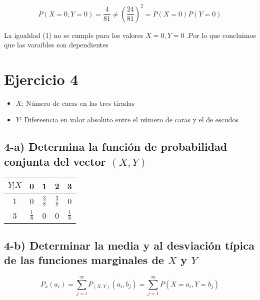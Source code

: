 \documentclass[12pt]{article}
\begin{document}
\begin{equation*}
    P\left(X = 0,Y = 0\right) =   \displaystyle \frac{4}{81}  \neq \displaystyle \left(\frac{24}{81}\right)^2 = P\left(X = 0\right) P\left(Y = 0\right)
\end{equation*}

\begin{flushleft}
    La igualdad (1) no se cumple para los valores  $X = 0,Y = 0$ .Por lo que concluimos que 
    las varaibles son dependientes 
\end{flushleft}


\section*{Ejercicio 4 }

\begin{itemize}
    \item $X$: N\'umero de caras en las tres tiradas
    \item $Y$: Difereencia en valor absoluto entre el n\'umero de caras y el de escudos
\end{itemize}

\subsection*{4-a) Determina la funci\'on de probabilidad conjunta del vector $\left(X,Y\right)$}


\begin{center}
    \renewcommand{\arraystretch}{1.5}
    \begin{tabular}{|c|c|c|c|c|}
        \hline
        $Y|X$ & 0             & 1               & 2              & 3
        \\
        \hline
        1     & 0             & $  \frac{3}{8}$ & $\frac{3}{8} $ & 0
        \\
        \hline
        3     & $\frac{1}{8}$ & 0               & 0              & $\frac{1}{8}$
        \\
        \hline
    \end{tabular}
\end{center}


\subsection*{4-b) Determinar la media y al desviaci\'on t\'ipica de las funciones marginales  de $X$ y  $Y$ }

\begin{equation*}
    P_x \left(a_i\right) = \sum_{j=i}^{\infty} P_{\left(X,Y\right)}\left(a_i,b_j\right) = \sum_{j=1}^{\infty} P \left(X =a_i , Y = b_j\right)
\end{equation*}
\end{document}
